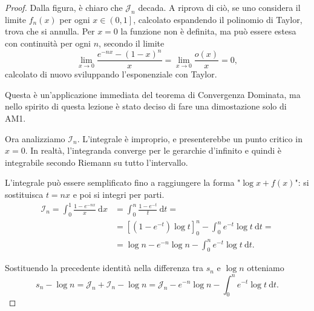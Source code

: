\begin{proof}
	Dalla figura, è chiaro che $\mathcal{J}_n$ decada. 
	A riprova di ciò, se uno considera il limite $f_n(x)$ per ogni $x \in \left( 0,1 \right]$, calcolato espandendo il polinomio di Taylor, trova che si annulla. Per $x=0$ la funzione non è definita, ma può essere estesa con continuità per ogni $n$, secondo il limite
	\begin{equation*}
		\lim \limits_{x \to0} \frac{e^{-nx}-(1-x)^n}{x}= 
		\lim \limits_{x \to0} \frac{o(x)}{x}=
		0,
	\end{equation*}
	calcolato di nuovo sviluppando l'esponenziale con Taylor.

	Questa è un'applicazione immediata del teorema di Convergenza Dominata, ma nello spirito di questa lezione è stato deciso di fare una dimostazione solo di AM1.

	
	


	Ora analizziamo $ \mathcal{I}_n$. 
	L'integrale è improprio, e presenterebbe un punto critico in $x=0$. 
	In realtà, l'integranda converge per le gerarchie d'infinito e quindi è integrabile secondo Riemann su tutto l'intervallo.

	L'integrale può essere semplificato fino a raggiungere la forma "$ \log x +f(x)$": si sostituisca $t=nx$ e poi si integri per parti.
	\begin{align*}
			\mathcal{I}_n= 
			\int^1_0 \frac{1-e^{-nx}}{x} \: \mathrm{d}x
			&= 
			\int^n_0 \frac{1-e^{-t}}{t} \: \mathrm{d}t= 
			\\ &= 
			\left[ \left(1-e^{-t} \right) \log t \right]^n_0 - \int^n_0 e^{-t} \log t \: \mathrm{d}t=
			\\ &=
			\log n-e^{-n} \log n- \int^n_0e^{-t} \log t \: \mathrm{d}t.
	\end{align*}

	Sostituendo la precedente identità nella differenza tra $s_n$ e $ \log n$ otteniamo
	\begin{equation*}
		s_n- \log n= 
		\mathcal{J}_n+ \mathcal{I}_n- \log n= 
		\mathcal{J}_n-e^{-n} \log n- \int^n_0 e^{-t} \log t \: \mathrm{d}t.
	\end{equation*}


\end{proof}

